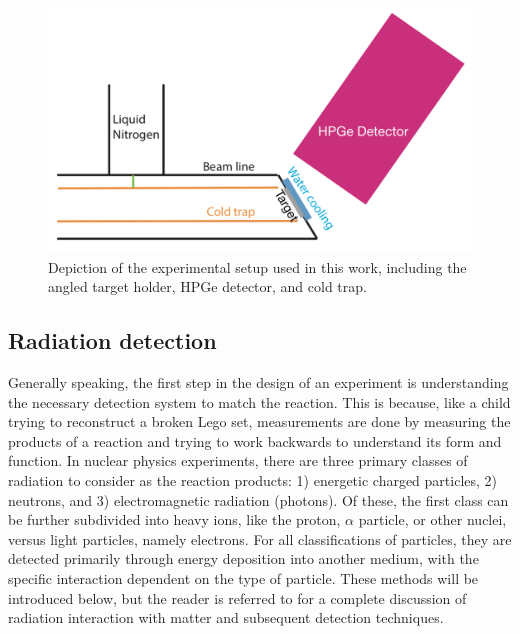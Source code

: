 \begin{figure}
\centering
\includegraphics[width=0.8\linewidth]{figures/expSetup.png}
\caption{Depiction of the experimental setup used in this work, including the angled target holder, HPGe detector, and cold trap.}
\label{fig: setup}
\end{figure}



\subsection{Radiation detection}
\label{sec: detectors}

Generally speaking, the first step in the design of an experiment is understanding the necessary detection system to match the reaction. This is because, like a child trying to reconstruct a broken Lego set, measurements are done by measuring the products of a reaction and trying to work backwards to understand its form and function. In nuclear physics experiments, there are three primary classes of radiation to consider as the reaction products: 1) energetic charged particles, 2) neutrons, and 3) electromagnetic radiation (photons). Of these, the first class can be further subdivided into heavy ions, like the proton, $\alpha$ particle, or other nuclei, versus light particles, namely electrons. For all classifications of particles, they are detected primarily through energy deposition into another medium, with the specific interaction dependent on the type of particle. These methods will be introduced below, but the reader is referred to \cite{KnollBook} for a complete discussion of radiation interaction with matter and subsequent detection techniques.  

